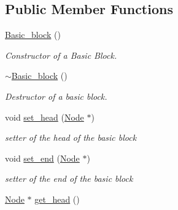 \subsection*{\-Public \-Member \-Functions}
\begin{DoxyCompactItemize}
\item 
\hypertarget{classBasic__block_aa2455e1b1b8f5ac9b1c128f121fe3d67}{\hyperlink{classBasic__block_aa2455e1b1b8f5ac9b1c128f121fe3d67}{\-Basic\-\_\-block} ()}\label{classBasic__block_aa2455e1b1b8f5ac9b1c128f121fe3d67}

\begin{DoxyCompactList}\small\item\em \-Constructor of a \-Basic \-Block. \end{DoxyCompactList}\item 
\hypertarget{classBasic__block_a0047b58d9a30fa6eb79a87c70e9176d0}{\hyperlink{classBasic__block_a0047b58d9a30fa6eb79a87c70e9176d0}{$\sim$\-Basic\-\_\-block} ()}\label{classBasic__block_a0047b58d9a30fa6eb79a87c70e9176d0}

\begin{DoxyCompactList}\small\item\em \-Destructor of a basic block. \end{DoxyCompactList}\item 
\hypertarget{classBasic__block_a1fa279bf9b2750ba0042b1fe87e5c343}{void \hyperlink{classBasic__block_a1fa279bf9b2750ba0042b1fe87e5c343}{set\-\_\-head} (\hyperlink{classNode}{\-Node} $\ast$)}\label{classBasic__block_a1fa279bf9b2750ba0042b1fe87e5c343}

\begin{DoxyCompactList}\small\item\em setter of the head of the basic block \end{DoxyCompactList}\item 
\hypertarget{classBasic__block_aebf407fc956b148ef145b0a6233d0361}{void \hyperlink{classBasic__block_aebf407fc956b148ef145b0a6233d0361}{set\-\_\-end} (\hyperlink{classNode}{\-Node} $\ast$)}\label{classBasic__block_aebf407fc956b148ef145b0a6233d0361}

\begin{DoxyCompactList}\small\item\em setter of the end of the basic block \end{DoxyCompactList}\item 
\hypertarget{classBasic__block_ac317495c3e84de7431562490dcedff9e}{\hyperlink{classNode}{\-Node} $\ast$ \hyperlink{classBasic__block_ac317495c3e84de7431562490dcedff9e}{get\-\_\-head} ()}\label{classBasic__block_ac317495c3e84de7431562490dcedff9e}


\end{DoxyCompactItemize}
